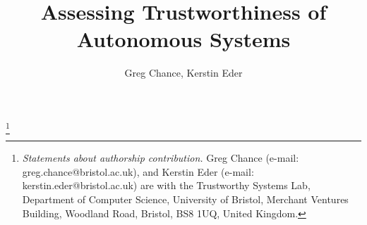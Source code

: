 \documentclass[runningheads,twocolumn,a4paper,10pt]{llncs}
\newcommand\nnfootnote[1]{%
  \begin{NoHyper}
  \renewcommand\thefootnote{}\footnote{#1}%
  \addtocounter{footnote}{-1}%
  \end{NoHyper}
}
\begin{document}
 

\title{Assessing Trustworthiness of Autonomous Systems}
\author{Greg Chance, Kerstin Eder}


\maketitle
\nnfootnote{
\textit{Statements about authorship contribution.}
%
Greg Chance (e-mail: greg.chance@bristol.ac.uk), 
and 
Kerstin Eder (e-mail: kerstin.eder@bristol.ac.uk) 
are with the Trustworthy Systems Lab, Department of Computer Science, University of Bristol, Merchant Ventures Building, Woodland Road, Bristol, BS8 1UQ, United Kingdom.
}


%
\makeatletter
\renewcommand\subsubsection{\@startsection{subsubsection}{3}{\z@}%
                       {-18\p@ \@plus -4\p@ \@minus -4\p@}%
                       {4\p@ \@plus 2\p@ \@minus 2\p@}%
                       {\normalfont\normalsize\bfseries\boldmath
                        \rightskip=\z@ \@plus 8em\pretolerance=10000 }}
\makeatother
\end{document}
